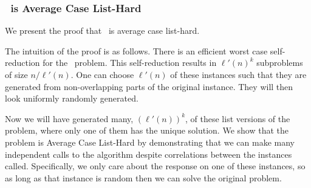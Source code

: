 \subsubsection{\zkclique~is Average Case List-Hard}

We present the proof that \zkclique~is average case list-hard.

The intuition of the proof is as follows. There is an efficient worst case self-reduction for the \zkclique~problem. This self-reduction results in $\ell'(n)^k$ subproblems of size $n/\ell'(n)$. One can choose $\ell'(n)$ of these instances such that they are generated from non-overlapping parts of the original instance. They will then look uniformly randomly generated. 

Now we will have generated many, $(\ell'(n))^k$, of these list versions of the \zkclique~ problem, where only one of them has the unique solution. We show that the problem is Average Case List-Hard by demonstrating that we can make many independent calls to the algorithm despite correlations between the instances called. Specifically, we only care about the response on one of these instances, so as long as that instance is random then we can solve the original problem. 


